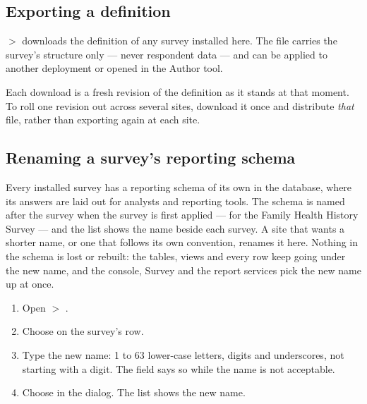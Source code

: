 \documentclass[11pt, a4paper]{article}
\begin{document}
\subsection{Exporting a definition}

 $>$  downloads the definition of any survey installed
here. The file carries the survey's structure only — never respondent data — and can be applied
to another deployment or opened in the Author tool.


Each download is a fresh revision of the definition as it stands at that moment. To roll one
revision out across several sites, download it once and distribute \emph{that} file, rather than
exporting again at each site.

\subsection{Renaming a survey's reporting schema}

Every installed survey has a reporting schema of its own in the database, where its answers are
laid out for analysts and reporting tools. The schema is named after the survey when the survey
is first applied —  for the Family Health History Survey —
and the  list shows the name beside each survey. A site that wants a
shorter name, or one that follows its own convention, renames it here. Nothing in the schema is
lost or rebuilt: the tables, views and every row keep going under the new name, and the console,
Survey and the report services pick the new name up at once.

\begin{enumerate}
  \item Open  $>$ .
  \item Choose  on the survey's row.
  \item Type the new name: 1 to 63 lower-case letters, digits and underscores, not starting
        with a digit. The field says so while the name is not acceptable.
  \item Choose  in the dialog. The list shows the new name.
\end{enumerate}
\end{document}
